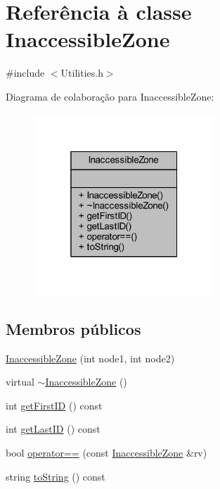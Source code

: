 \hypertarget{class_inaccessible_zone}{}\section{Referência à classe Inaccessible\+Zone}
\label{class_inaccessible_zone}


{\ttfamily \#include $<$Utilities.\+h$>$}



Diagrama de colaboração para Inaccessible\+Zone\+:
\nopagebreak
\begin{figure}[H]
\begin{center}
\leavevmode
\includegraphics[width=193pt]{class_inaccessible_zone__coll__graph}
\end{center}
\end{figure}
\subsection*{Membros públicos}
\begin{DoxyCompactItemize}
\item 
\hyperlink{class_inaccessible_zone_ac571011fba0cd079537990d67e5199fa}{Inaccessible\+Zone} (int node1, int node2)
\item 
virtual \hyperlink{class_inaccessible_zone_a1048b0128b094ea474032ee718eaecb7}{$\sim$\+Inaccessible\+Zone} ()
\item 
int \hyperlink{class_inaccessible_zone_a409eaa2fbfb3f84317a89c81e07dbafe}{get\+First\+I\+D} () const 
\item 
int \hyperlink{class_inaccessible_zone_ad797feb433c52fc0922ce166d4a6df1e}{get\+Last\+I\+D} () const 
\item 
bool \hyperlink{class_inaccessible_zone_a02480a51fb032c5fee74fab422fe5166}{operator==} (const \hyperlink{class_inaccessible_zone}{Inaccessible\+Zone} \&rv)
\item 
string \hyperlink{class_inaccessible_zone_a1f6e8009d1892572c7072e4fb8bb1d31}{to\+String} () const 
\end{DoxyCompactItemize}


